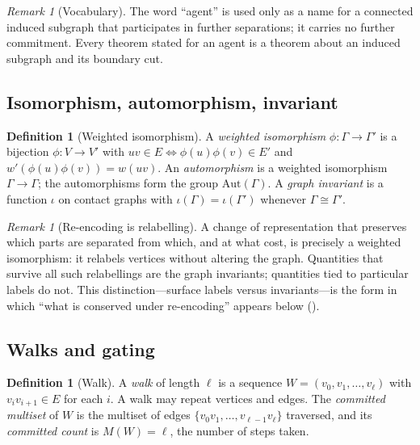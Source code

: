 \documentclass[11pt,a4paper]{article}
\theoremstyle{thmstyle}
\theoremstyle{definition}
\newtheorem{definition}[theorem]{Definition}
\theoremstyle{remark}
\newtheorem{remark}[theorem]{Remark}
\newcommand{\Gph}{\Gamma}                 %
\newcommand{\V}{V}                        %
\newcommand{\E}{E}                        %
\newcommand{\wt}{w}                       %
\newcommand{\Walk}{W}                     %
\newcommand{\rec}{M}                      %
\begin{document}
\begin{remark}[Vocabulary]
\label{rem:agent-word}
The word ``agent'' is used only as a name for a connected induced subgraph that
participates in further separations; it carries no further commitment. Every
theorem stated for an agent is a theorem about an induced subgraph and its
boundary cut.
\end{remark}

\subsection{Isomorphism, automorphism, invariant}

\begin{definition}[Weighted isomorphism]
\label{def:iso}
A \emph{weighted isomorphism} $\phi\colon\Gph\to\Gph'$ is a bijection
$\phi\colon\V\to\V'$ with $uv\in\E\iff\phi(u)\phi(v)\in\E'$ and
$\wt'(\phi(u)\phi(v))=\wt(uv)$. An \emph{automorphism} is a weighted isomorphism
$\Gph\to\Gph$; the automorphisms form the group $\mathrm{Aut}(\Gph)$. A
\emph{graph invariant} is a function $\iota$ on contact graphs with
$\iota(\Gph)=\iota(\Gph')$ whenever $\Gph\cong\Gph'$.
\end{definition}

\begin{remark}[Re-encoding is relabelling]
\label{rem:reencode}
A change of representation that preserves which parts are separated from which,
and at what cost, is precisely a weighted isomorphism: it relabels vertices
without altering the graph. Quantities that survive all such relabellings are
the graph invariants; quantities tied to particular labels do not. This
distinction---surface labels versus invariants---is the form in which
``what is conserved under re-encoding'' appears below ().
\end{remark}

\subsection{Walks and gating}

\begin{definition}[Walk]
\label{def:walk}
A \emph{walk} of length $\ell$ is a sequence
$\Walk=(v_0,v_1,\dots,v_\ell)$ with $v_{i}v_{i+1}\in\E$ for each $i$. A walk may
repeat vertices and edges. The \emph{committed multiset} of $\Walk$ is the
multiset of edges $\{v_0v_1,\dots,v_{\ell-1}v_\ell\}$ traversed, and its
\emph{committed count} is $\rec(\Walk)=\ell$, the number of steps taken.
\end{definition}
\end{document}
